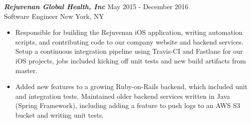 {\sl \textbf{Rejuvenan Global Health, Inc}} \hfill May 2015 - December 2016 \\
Software Engineer \hfill New York, NY
\begin{itemize}
\item Responsible for building the Rejuvenan iOS application, writing automation scripts, and contributing code to our company website and backend services. Setup a continuous integration pipeline using Travis-CI and Fastlane for our iOS projects, jobs included kicking off unit tests and new build artifacts from master.
\item Added new features to a growing Ruby-on-Rails backend, which included unit and integration tests. Maintained older backend services written in Java (Spring Framework), including adding a feature to push logs to an AWS S3 bucket and writing unit tests.
\end{itemize}
